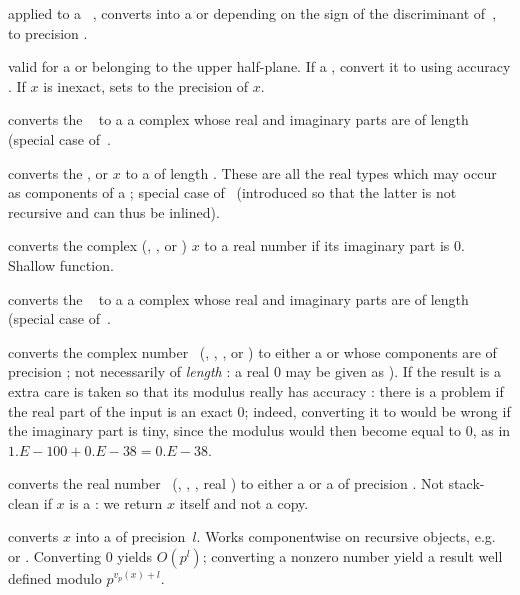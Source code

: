  applied to a ~, converts
 into a  or  depending on the sign of the
discriminant of~, to precision .

 valid for a 
or  belonging to the upper half-plane. If a , convert it
to  using accuracy . If $x$ is inexact, sets
 to the precision of $x$.

 converts the ~ to a
a complex whose real and imaginary parts are  of length 
(special case of~.

 converts the
,  or  $x$ to a  of length .
These are all the real types which may occur as components of a
; special case of~ (introduced so that the latter is
not recursive and can thus be inlined).

 converts the complex (, ,
 or ) $x$ to a real number if its imaginary part is 0.
Shallow function.

converts the ~ to a
a complex whose real and imaginary parts are  of length 
(special case of~.

 converts the complex number~
(, , ,  or ) to either
a  or  whose components are  of precision
; not necessarily of \emph{length} : a real $0$ may be
given as ). If the result is a  extra care is
taken so that its modulus really has accuracy : there is a problem
if the real part of the input is an exact $0$; indeed, converting it to
 would be wrong if the imaginary part is tiny, since the
modulus would then become equal to $0$, as in $1.E-100 + 0.E-38 = 0.E-38$.

 converts the real number~
(, , , real ) to either
a  or a  of precision . Not stack-clean
if $x$ is a : we return $x$ itself and not a copy.

 converts $x$ into a 
of precision~$l$. Works componentwise on recursive objects,
e.g.~ or . Converting $0$ yields $O(p^l)$; converting a
nonzero number yield a result well defined modulo $p^{v_p(x) + l}$.

